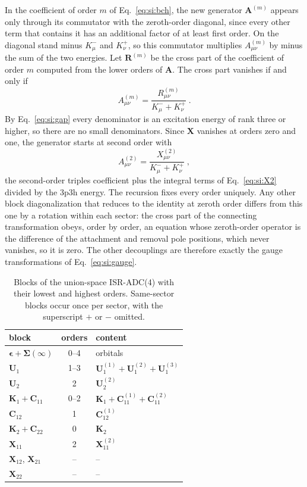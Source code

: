 \documentclass[aip,jcp,reprint,noshowkeys,superscriptaddress]{revtex4-2}
\theoremstyle{plain}
\theoremstyle{definition}
\theoremstyle{remark}
\begin{document}
In the coefficient of order $m$ of Eq.~\eqref{eq:si:bch}, the new generator
$\mathbf{A}^{(m)}$ appears only through its commutator with the zeroth-order
diagonal, since every other term that contains it has an additional factor of
at least first order. On the diagonal stand minus $K^-_\mu$ and $K^+_\nu$, so
this commutator multiplies $A^{(m)}_{\mu\nu}$ by minus the sum of the two
energies. Let $\mathbf{R}^{(m)}$ be the cross part of the coefficient of order
$m$ computed from the lower orders of $\mathbf{A}$. The cross part vanishes if
and only if
\begin{equation}
A^{(m)}_{\mu\nu}=\frac{R^{(m)}_{\mu\nu}}{K^-_\mu+K^+_\nu} \;.
\label{eq:si:Arec}
\end{equation}
By Eq.~\eqref{eq:si:gap} every denominator is an excitation energy of rank
three or higher, so there are no small denominators. Since $\mathbf{X}$
vanishes at orders zero and one, the generator starts at second order with
\begin{equation}
A^{(2)}_{\mu\nu}=\frac{X^{(2)}_{\mu\nu}}{K^-_\mu+K^+_\nu} \;,
\label{eq:si:A2}
\end{equation}
the second-order triples coefficient plus the integral terms of
Eq.~\eqref{eq:si:X2} divided by the 3p3h energy. The recursion fixes every
order uniquely. Any other block diagonalization that reduces to the identity
at zeroth order differs from this one by a rotation within each sector: the
cross part of the connecting transformation obeys, order by order, an equation
whose zeroth-order operator is the difference of the attachment and removal
pole positions, which never vanishes, so it is zero. The other decouplings
are therefore exactly the gauge transformations of Eq.~\eqref{eq:si:gauge}.

\begin{table}[hbt!]
\caption{Blocks of the union-space ISR-ADC(4) with their lowest and highest orders. Same-sector blocks occur once per sector, with the superscript $+$ or $-$ omitted.}
\label{tab:si:adc4}
\begin{tabular}{lcl}
\hline\hline
block & orders & content\\
\hline
$\pmb{\epsilon}+\pmb{\Sigma}(\infty)$ & 0--4 & orbitals\\
$\mathbf{U}_1$ & 1--3 & $\mathbf{U}^{(1)}_1+\mathbf{U}^{(2)}_1+\mathbf{U}^{(3)}_1$\\
$\mathbf{U}_2$ & 2 & $\mathbf{U}^{(2)}_2$\\
$\mathbf{K}_1+\mathbf{C}_{11}$ & 0--2 & $\mathbf{K}_1+\mathbf{C}^{(1)}_{11}+\mathbf{C}^{(2)}_{11}$\\
$\mathbf{C}_{12}$ & 1 & $\mathbf{C}^{(1)}_{12}$\\
$\mathbf{K}_2+\mathbf{C}_{22}$ & 0 & $\mathbf{K}_2$\\
$\mathbf{X}_{11}$ & 2 & $\mathbf{X}^{(2)}_{11}$\\
$\mathbf{X}_{12}$, $\mathbf{X}_{21}$ & -- & --\\
$\mathbf{X}_{22}$ & -- &  --\\
\hline\hline
\end{tabular}
\end{table}
\end{document}
